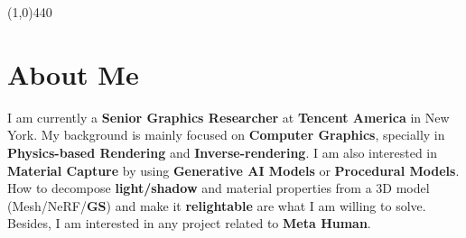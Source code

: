 \documentclass[margin,line]{resume}
\begin{document}
\begin{resume}


    



	\vspace{-5.0mm}
	\line(1,0){440}
	\vspace{-5.0mm}
	
	\section{\mysidestyle About Me}
	
	I am currently a \textbf{Senior Graphics Researcher} at \textbf{Tencent America} in New York. 
	My background is mainly focused on \textbf{Computer Graphics}, specially in \textbf{Physics-based Rendering} and \textbf{Inverse-rendering}. I am also interested in \textbf{Material Capture} by using \textbf{Generative AI Models} or \textbf{Procedural Models}. How to decompose \textbf{light/shadow} and material properties from a 3D model (Mesh/NeRF/\textbf{GS}) and make it \textbf{relightable} are what I am willing to solve. Besides, I am interested in any project related to \textbf{Meta Human}.     


\end{resume}
\end{document}
